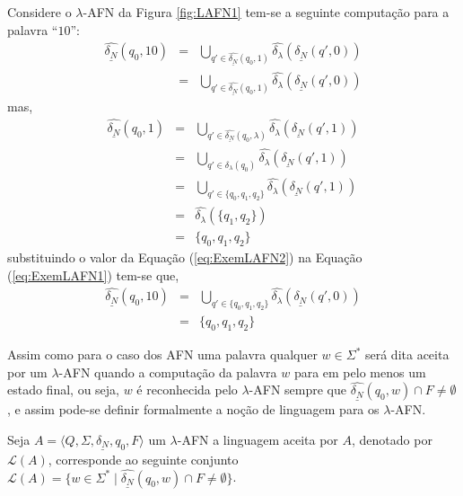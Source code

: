 \begin{exemplo}
	Considere o $\lambda$-AFN da Figura \ref{fig:LAFN1} tem-se a seguinte computação para a palavra ``$10$'':
	\begin{eqnarray}\label{eq:ExemLAFN1}
		\widehat{\underline{\delta_N}}(q_0, 10) & = & \bigcup_{q' \in \widehat{\underline{\delta_N}}(q_0, 1)} \widehat{\delta_\lambda}(\underline{\delta_N}(q', 0))\nonumber\\
		& = & \bigcup_{q' \in \widehat{\underline{\delta_N}}(q_0, 1)} \widehat{\delta_\lambda}(\underline{\delta_N}(q', 0))
	\end{eqnarray}
	mas,
	\begin{eqnarray}\label{eq:ExemLAFN2}
		\widehat{\underline{\delta_N}}(q_0, 1) & = & \bigcup_{q' \in \widehat{\underline{\delta_N}}(q_0, \lambda)} \widehat{\delta_\lambda}(\underline{\delta_N}(q', 1))\nonumber\\
		& = & \bigcup_{q' \in \delta_\lambda(q_0)} \widehat{\delta_\lambda}(\underline{\delta_N}(q', 1))\nonumber\\
		& = & \bigcup_{q' \in \{q_0, q_1, q_2\}} \widehat{\delta_\lambda}(\underline{\delta_N}(q', 1))\\
		& = & \widehat{\delta_\lambda}(\{q_1, q_2\})\nonumber\\
		& = & \{q_0, q_1, q_2\}\nonumber
	\end{eqnarray}
	substituindo o valor da Equação (\ref{eq:ExemLAFN2}) na Equação (\ref{eq:ExemLAFN1}) tem-se que, 
	\begin{eqnarray*}
		\widehat{\underline{\delta_N}}(q_0, 10) & = & \bigcup_{q' \in \{q_0, q_1, q_2\}} \widehat{\delta_\lambda}(\underline{\delta_N}(q', 0))\\
		& = & \{q_0, q_1, q_2\}
	\end{eqnarray*}
\end{exemplo}

Assim como para o caso dos AFN uma palavra qualquer $w \in \Sigma^*$ será dita aceita por um $\lambda$-AFN quando a computação da palavra $w$ para em pelo menos um estado final, ou seja, $w$ é reconhecida pelo $\lambda$-AFN sempre que $\widehat{\underline{\delta_N}}(q_0, w) \cap F \neq \emptyset$, e assim pode-se definir formalmente a noção de linguagem para os $\lambda$-AFN.

\begin{definicao}\label{def:LinguagelLAFN}
	Seja $A = \langle Q, \Sigma, \underline{\delta_N}, q_0, F\rangle$ um $\lambda$-AFN a linguagem aceita por $A$, denotado por $\mathcal{L}(A)$, corresponde ao seguinte conjunto $\mathcal{L}(A) = \{w \in \Sigma^* \mid \widehat{\underline{\delta_N}}(q_0, w) \cap F \neq \emptyset\}$.
\end{definicao}

